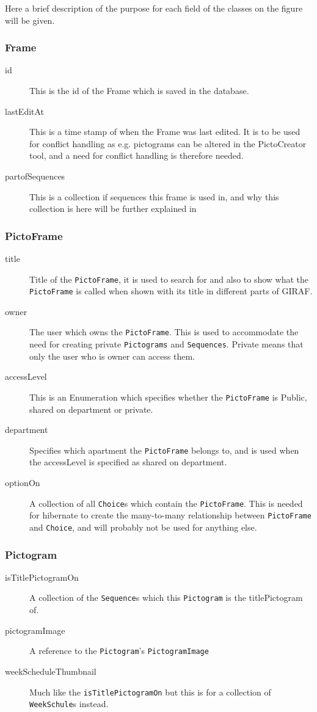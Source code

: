 Here a brief description of the purpose for each field of the classes on the figure will be given.
\subsubsection*{Frame}
	\begin{description}
		\item[id] This is the id of the Frame which is saved in the database.
		\item[lastEditAt] This is a time stamp of when the Frame was last edited. 
		It is to be used for conflict handling as e.g. pictograms can be altered in the PictoCreator tool, and a need for conflict handling is therefore needed.
		\item[partofSequences] This is a collection if sequences this frame is used in, and why this collection is here will be further explained in 
	\end{description}

\subsubsection*{PictoFrame}
	\begin{description}
		\item[title] Title of the \texttt{PictoFrame}, it is used to search for and also to show what the \texttt{PictoFrame} is called when shown with its title in different parts of GIRAF.
		\item[owner] The user which owns the \texttt{PictoFrame}. 
		This is used to accommodate the need for creating private \texttt{Pictograms} and \texttt{Sequences}.
		Private means that only the user who is owner can access them.
		\item[accessLevel] This is an Enumeration which specifies whether the \texttt{PictoFrame} is Public, shared on department or private.
		\item[department] Specifies which apartment the \texttt{PictoFrame} belongs to, and is used when the accessLevel is specified as shared on department.
		\item[optionOn] A collection of all \texttt{Choice}s which contain the \texttt{PictoFrame}.
		This is needed for hibernate to create the many-to-many relationship between \texttt{PictoFrame} and \texttt{Choice}, and will probably not be used for anything else.
	\end{description}

\subsubsection*{Pictogram}
	\begin{description}
		\item[isTitlePictogramOn] A collection of the \texttt{Sequence}s which this \texttt{Pictogram} is the titlePictogram of.
		\item[pictogramImage] A reference to the \texttt{Pictogram}'s \texttt{PictogramImage}
		\item [weekScheduleThumbnail] Much like the \texttt{isTitlePictogramOn} but this is for a collection of \texttt{WeekSchule}s instead.
	\end{description}

